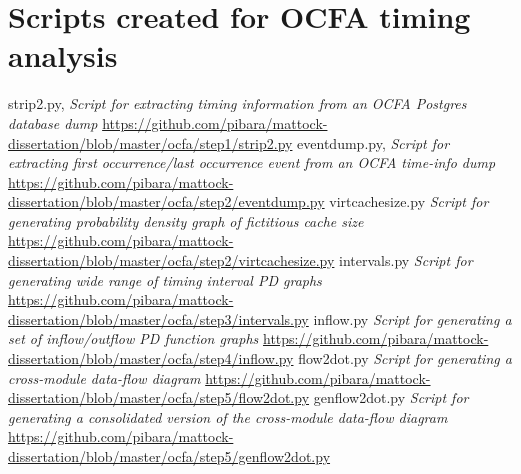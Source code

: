\chapter{Scripts created for OCFA timing analysis}
\noindent 
\begin{thebibliography}{1}
 strip2.py, {\em Script for extracting timing information from an OCFA  Postgres database dump}  \url{https://github.com/pibara/mattock-dissertation/blob/master/ocfa/step1/strip2.py}
 eventdump.py, {\em Script for extracting first occurrence/last occurrence event from an OCFA time-info dump} \url{https://github.com/pibara/mattock-dissertation/blob/master/ocfa/step2/eventdump.py}
 virtcachesize.py {\em Script for generating probability density graph of fictitious cache size}  \url{https://github.com/pibara/mattock-dissertation/blob/master/ocfa/step2/virtcachesize.py}
 intervals.py {\em Script for generating wide range of timing interval PD graphs}  \url{https://github.com/pibara/mattock-dissertation/blob/master/ocfa/step3/intervals.py}
 inflow.py {\em Script for generating a set of inflow/outflow PD function graphs}  \url{https://github.com/pibara/mattock-dissertation/blob/master/ocfa/step4/inflow.py}
 flow2dot.py {\em Script for generating a cross-module data-flow diagram} \url{https://github.com/pibara/mattock-dissertation/blob/master/ocfa/step5/flow2dot.py}
 genflow2dot.py {\em Script for generating a consolidated version of the cross-module data-flow diagram}  \url{https://github.com/pibara/mattock-dissertation/blob/master/ocfa/step5/genflow2dot.py}
\end{thebibliography}
